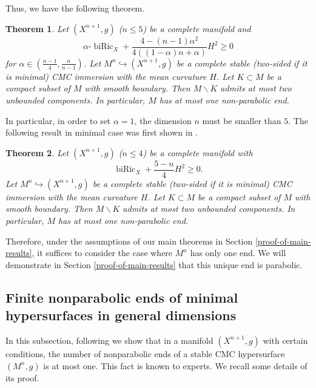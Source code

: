 \documentclass[11pt,letterpaper]{amsart}
\DeclareMathOperator{\biRic}{biRic}
\newtheorem{theorem}{Theorem}[section]
\theoremstyle{definition}
\theoremstyle{remark}
\numberwithin{equation}{section}
\begin{document}
Thus, we have the following theorem.
 
\begin{theorem}\label{oneend1}
	Let $(X^{n+1},g)$ ($n\leq 5$) be a complete manifold  and 
    $$\alpha\text{-}\biRic_X+\frac{4-(n-1)\alpha^2}{4((1-\alpha)n+\alpha)}H^2\geqslant 0$$
    for $\alpha\in (\frac{n-1}{4},\frac{n}{n-1})$. Let $M^n\hookrightarrow (X^{n+1},g)$ be a complete stable (two-sided if it is minimal) CMC immersion with the mean curvature $H$. Let $K\subset M$ be a compact subset of $M$ with smooth boundary. Then $M\backslash K$ admits at most two unbounded components. In particular, $M$ has at most one non-parabolic end.
\end{theorem} 

In particular, in order to set $\alpha=1$, the dimension $n$ must be smaller than $5$. The following result in minimal case was first shown in \cite[Corollary 1.2]{antonelli-pozzetta-xu}. 

\begin{theorem}\label{oneend}
	Let $(X^{n+1},g)$ ($n\leq 4$) be a complete manifold  with $$\biRic_X+\frac{5-n}{4}H^2\geqslant 0.$$ Let $M^n\hookrightarrow (X^{n+1},g)$ be a complete  stable (two-sided if it is minimal) CMC immersion  with the mean curvature $H$. Let $K\subset M$ be a compact subset of $M$ with smooth boundary. Then $M\backslash K$ admits at most two unbounded components. In particular, $M$ has at most one non-parabolic end.
\end{theorem} 

Therefore, under the assumptions of our main theorems in Section \ref{proof-of-main-results}, it suffices to consider the case where $M^n$ has only one end. We will demonstrate in Section \ref{proof-of-main-results} that this unique end is parabolic. 



\subsection{Finite nonparabolic ends of minimal hypersurfaces in general dimensions}
In this subsection, following  \cite{Li-Wang-nonnegatively-curved-manifold} we show that in a manifold $(X^{n+1},g)$ with certain conditions, the number of nonparabolic ends of a stable CMC hypersurface $(M^n,g)$ is at most one.  This fact is known to experts. We recall some details of its proof.
\end{document}
